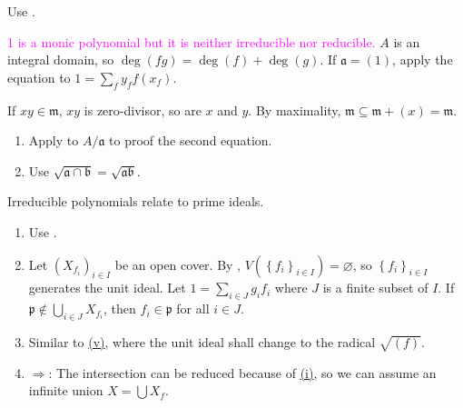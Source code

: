 \begin{exercise}\label{ex1.12}
	Use .
\end{exercise}

\begin{exercise}\label{ex1.13}
	\textcolor{magenta}{1 is a monic polynomial but it is neither irreducible nor reducible.} $A$ is an integral domain, so $\operatorname{deg}\left(fg\right)=\operatorname{deg}\left(f\right)+\operatorname{deg}\left(g\right)$. If $\mathfrak{a}=(1)$, apply the equation to $1=\sum_{f}y_ff(x_f)$.
\end{exercise}

\begin{exercise}\label{ex1.14}
	If $xy\in\mathfrak{m}$, $xy$ is zero-divisor, so are $x$ and $y$. By maximality, $\mathfrak{m}\subseteq\mathfrak{m}+(x)=\mathfrak{m}$.
\end{exercise}

\begin{exercise}\label{ex1.15}
	\begin{enumerate}
		\item[(i)] Apply  to $A/\mathfrak{a}$ to proof the second equation.
		\item[(iv)] Use $\sqrt{\mathfrak{a}\cap\mathfrak{b}}=\sqrt{\mathfrak{ab}}$.
	\end{enumerate}
\end{exercise}

\begin{exercise}\label{ex1.16}
	Irreducible polynomials relate to prime ideals.
\end{exercise}

\begin{exercise}\label{ex1.17}
	\begin{enumerate}[label=(\roman*),ref=\theexercise(\roman*)]
		\item[(i)-(iv)]\label{ex1.17.1} Use .
		\addtocounter{enumi}{4}
		\item\label{ex1.17.5} Let $\left(X_{f_i}\right)_{i\in I}$ be an open cover. By , $V\left(\left\{f_i\right\}_{i\in I}\right)=\varnothing$, so $\left\{f_i\right\}_{i\in I}$ generates the unit ideal. Let $1=\sum_{i\in J}g_if_i$ where $J$ is a finite subset of $I$. If $\mathfrak{p}\notin\bigcup_{i\in J}X_{f_i}$, then $f_i\in\mathfrak{p}$ for all $i\in J$.
		\item Similar to \hyperref[ex1.17.5]{(v)}, where the unit ideal shall change to the radical $\sqrt{(f)}$.
		\item\label{ex1.17.7} $\Rightarrow$: The intersection can be reduced because of \hyperref[ex1.17.1]{(i)}, so we can assume an infinite union $X=\bigcup X_f$.
	\end{enumerate}
\end{exercise}

